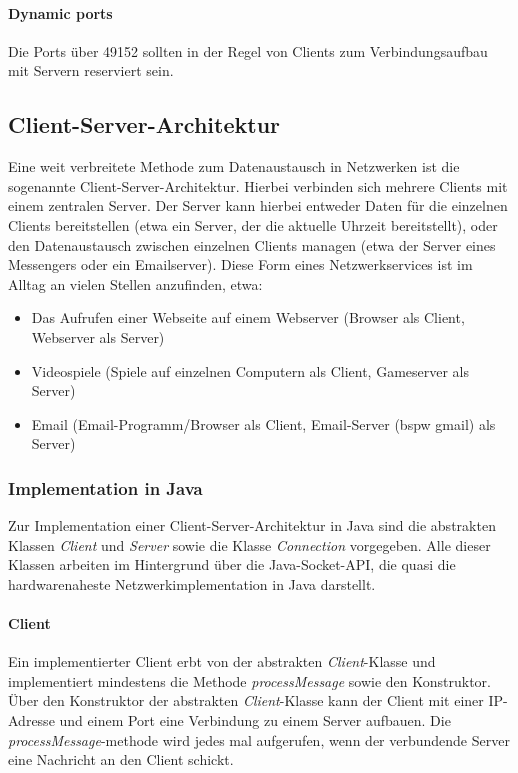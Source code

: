 \documentclass{article}
\begin{document}
	\paragraph{Dynamic ports}
	Die Ports über 49152 sollten in der Regel von Clients zum Verbindungsaufbau mit Servern reserviert sein.

	\subsection{Client-Server-Architektur}
	Eine weit verbreitete Methode zum Datenaustausch in Netzwerken ist die sogenannte Client-Server-Architektur. Hierbei verbinden sich mehrere Clients mit einem zentralen Server. Der Server kann hierbei entweder Daten für die einzelnen Clients bereitstellen (etwa ein Server, der die aktuelle Uhrzeit bereitstellt), oder den Datenaustausch zwischen einzelnen Clients managen (etwa der Server eines Messengers oder ein Emailserver). Diese Form eines Netzwerkservices ist im Alltag an vielen Stellen anzufinden, etwa:

	\begin{itemize}
		\item Das Aufrufen einer Webseite auf einem Webserver (Browser als Client, Webserver als Server)
		\item Videospiele (Spiele auf einzelnen Computern als Client, Gameserver als Server)
		\item Email (Email-Programm/Browser als Client, Email-Server (bspw gmail) als Server)
	\end{itemize}

	\subsubsection{Implementation in Java}
	Zur Implementation einer Client-Server-Architektur in Java sind die abstrakten Klassen \textit{Client} und \textit{Server} sowie die Klasse \textit{Connection} vorgegeben. Alle dieser Klassen arbeiten im Hintergrund über die Java-Socket-API, die quasi die hardwarenaheste Netzwerkimplementation in Java darstellt.

	\paragraph{Client}
	Ein implementierter Client erbt von der abstrakten \textit{Client}-Klasse und implementiert mindestens die Methode \textit{processMessage} sowie den Konstruktor. Über den Konstruktor der abstrakten \textit{Client}-Klasse kann der Client mit einer IP-Adresse und einem Port eine Verbindung zu einem Server aufbauen. Die \textit{processMessage}-methode wird jedes mal aufgerufen, wenn der verbundende Server eine Nachricht an den Client schickt. 
\end{document}
